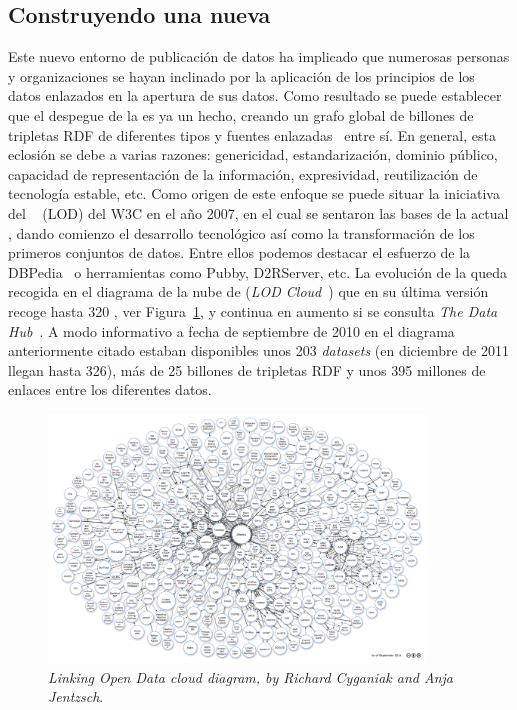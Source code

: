 \subsection{Construyendo una nueva \wod}
Este nuevo entorno de publicación de datos ha implicado que numerosas personas y organizaciones
se hayan inclinado por la aplicación de los principios de los datos enlazados en la apertura de sus datos. Como resultado
se puede establecer que el despegue de la \wod es ya un hecho, creando un grafo global de billones
de tripletas RDF de diferentes tipos y fuentes enlazadas~\cite{HoganUHCPD:2012:237} entre sí. En general, esta eclosión se debe
a varias razones: genericidad, estandarización, dominio público, capacidad de representación de la información, expresividad,
reutilización de tecnología estable, etc. Como origen de este enfoque se puede situar la iniciativa
del \lod~\cite{lod-group} (\gls{LOD}) del W3C en el año 2007, en el cual se sentaron las bases de la actual \wod, dando comienzo el desarrollo tecnológico así como la transformación de los primeros conjuntos de datos. Entre ellos
podemos destacar el esfuerzo de la DBPedia~\cite{dbpedia2009} o herramientas como \gls{Pubby}, D2RServer, etc. La evolución
de la \wod queda recogida en el diagrama de la nube de \datasets (\textit{LOD Cloud}~\cite{linked-data-cloud}) que en su última
versión recoge hasta 320 \datasets, ver Figura~\ref{fig:lod-cloud}, y continua en aumento si se consulta \textit{The Data Hub}~\cite{the-data-hub}. A modo informativo a fecha de septiembre
de 2010 en el diagrama anteriormente citado estaban disponibles unos 203 \textit{datasets} (en diciembre
de 2011 llegan hasta 326), más de 25 billones de tripletas \gls{RDF} y unos 395 millones de enlaces entre los diferentes datos.

\begin{figure}[!htb]
\centering
	\includegraphics[width=10cm]{images/phd/lod-datasets_2011-09-19_1000px}
\caption{\textit{Linking Open Data cloud diagram, by Richard Cyganiak and Anja Jentzsch}.}
\label{fig:lod-cloud}
\end{figure}

